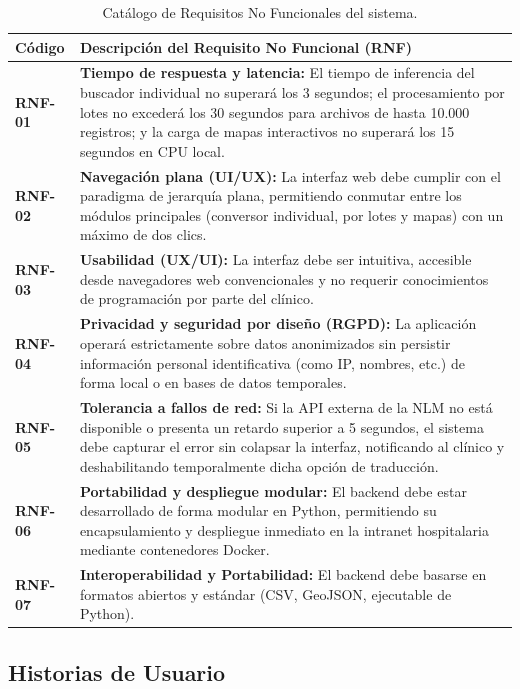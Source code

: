 \documentclass[12pt,a4paper,onecolumn,oneside]{report}
\begin{document}
\begin{table}[htbp]
\centering
\small
\renewcommand{\arraystretch}{1.2}
\begin{tabular}{lp{10cm}}
\hline
\textbf{Código} & \textbf{Descripción del Requisito No Funcional (RNF)} \\ \hline
\textbf{RNF-01} & \textbf{Tiempo de respuesta y latencia:} El tiempo de inferencia del buscador individual no superará los 3 segundos; el procesamiento por lotes no excederá los 30 segundos para archivos de hasta 10.000 registros; y la carga de mapas interactivos no superará los 15 segundos en CPU local. \\
\textbf{RNF-02} & \textbf{Navegación plana (UI/UX):} La interfaz web debe cumplir con el paradigma de jerarquía plana, permitiendo conmutar entre los módulos principales (conversor individual, por lotes y mapas) con un máximo de dos clics. \\
\textbf{RNF-03} & \textbf{Usabilidad (UX/UI):} La interfaz debe ser intuitiva, accesible desde navegadores web convencionales y no requerir conocimientos de programación por parte del clínico. \\
\textbf{RNF-04} & \textbf{Privacidad y seguridad por diseño (RGPD):} La aplicación operará estrictamente sobre datos anonimizados sin persistir información personal identificativa (como IP, nombres, etc.) de forma local o en bases de datos temporales. \\
\textbf{RNF-05} & \textbf{Tolerancia a fallos de red:} Si la API externa de la NLM no está disponible o presenta un retardo superior a 5 segundos, el sistema debe capturar el error sin colapsar la interfaz, notificando al clínico y deshabilitando temporalmente dicha opción de traducción. \\
\textbf{RNF-06} & \textbf{Portabilidad y despliegue modular:} El backend debe estar desarrollado de forma modular en Python, permitiendo su encapsulamiento y despliegue inmediato en la intranet hospitalaria mediante contenedores Docker. \\
\textbf{RNF-07} & \textbf{Interoperabilidad y Portabilidad:} El backend debe basarse en formatos abiertos y estándar (CSV, GeoJSON, ejecutable de Python). \\ \hline
\end{tabular}
\caption{Catálogo de Requisitos No Funcionales del sistema.}
\label{tab:requisitos_no_funcionales}
\end{table}
\clearpage

\subsection{Historias de Usuario}
\end{document}
